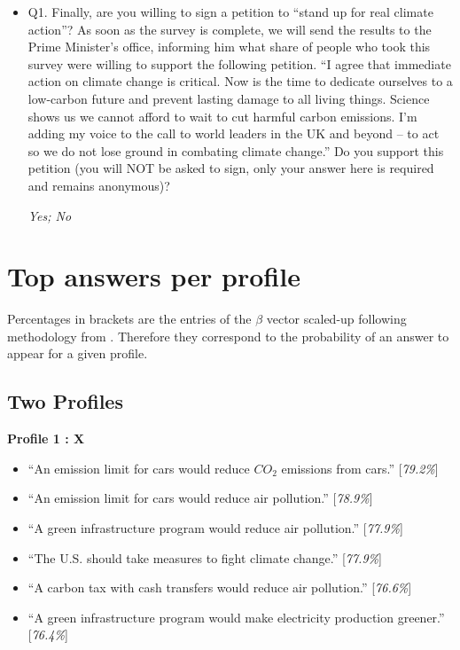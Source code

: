 \documentclass{article}
\begin{document}
\begin{itemize}
    \item Q1. Finally, are you willing to sign a petition to ``stand up for real climate action''?
    As soon as the survey is complete, we will send the results to the Prime Minister's office, informing him what share of people who took this survey were willing to support the following petition. 
    ``I agree that immediate action on climate change is critical. Now is the time to dedicate ourselves to a low-carbon future and prevent lasting damage to all living things. Science shows us we cannot afford to wait to cut harmful carbon emissions. I'm adding my voice to the call to world leaders in the UK and beyond -- to act so we do not lose ground in combating climate change.''
    Do you support this petition (you will NOT be asked to sign, only your answer here is required and remains anonymous)? 

    \textit{Yes; No}
\end{itemize}

\section{Top answers per profile}
Percentages in brackets are the entries of the $\beta$ vector scaled-up following methodology from \cite{draca2020polarized}. Therefore they correspond to the probability of an answer to appear for a given profile.
\subsection{Two Profiles}

\textbf{Profile 1 : X}

\begin{itemize}
    \item ``An emission limit for cars would reduce $CO_2$ emissions from cars.'' [\textit{79.2\%}]
    \item ``An emission limit for cars would reduce air pollution.'' [\textit{78.9\%}]
    \item ``A green infrastructure program would reduce air pollution.'' [\textit{77.9\%}]
    \item ``The U.S. should take measures to fight climate change.'' [\textit{77.9\%}]
    \item ``A carbon tax with cash transfers would reduce air pollution.'' [\textit{76.6\%}]
    \item ``A green infrastructure program would make electricity production greener.'' [\textit{76.4\%}]
\end{itemize}
\end{document}

